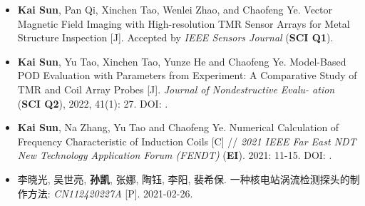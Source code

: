 \ifzh
{}
\begin{itemize}[leftmargin=1.5em]
    \item \textbf{Kai Sun}, Pan Qi, Xinchen Tao, Wenlei Zhao, and Chaofeng Ye. Vector Magnetic Field Imaging with High-resolution TMR Sensor Arrays for Metal Structure Inspection [J]. Accepted by \emph{IEEE Sensors Journal} (\textbf{SCI Q1}).
          \\{ \footnotesize {}}

    \item \textbf{Kai Sun}, Yu Tao, Xinchen Tao, Yunze He and Chaofeng Ye. Model-Based POD Evaluation with Parameters from Experiment: A Comparative Study of TMR and Coil Array Probes [J]. \textsl{Journal of Nondestructive Evalu- ation} (\textbf{SCI Q2}), 2022, 41(1): 27. DOI: .
          \\{ \footnotesize {}}

    \item \textbf{Kai Sun}, Na Zhang, Yu Tao and Chaofeng Ye. Numerical Calculation of Frequency Characteristic of Induction Coils [C] // \textsl{2021 IEEE Far East NDT New Technology Application Forum (FENDT)} (\textbf{EI}). 2021: 11-15. DOI: .
          \\{ \footnotesize {}}

    \item 李晓光, 吴世亮, \textbf{孙凯}, 张娜, 陶钰, 李阳, 裴希保. 一种核电站涡流检测探头的制作方法: \textsl{CN112420227A} [P]. 2021-02-26.
\end{itemize}
\else
{}
